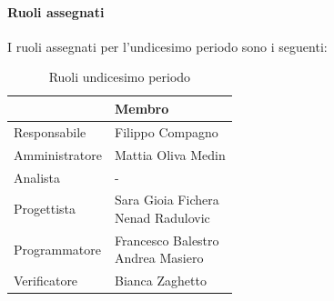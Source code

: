 \documentclass[a4paper,12pt]{article}
\begin{document}
            \paragraph{Ruoli assegnati}
            I ruoli assegnati per l'undicesimo periodo sono i seguenti:
                \begin{table}[H]
                \centering
                \caption{Ruoli undicesimo periodo}
                \begin{tabular}{|l|l|}
                \hline
                    \rowcolor{lightgray}{\textbf{Ruolo}} & {\textbf{Membro}} \\
                \hline
                    Responsabile & Filippo Compagno  \\
                \hline
                    Amministratore & Mattia Oliva Medin  \\
                \hline
                    Analista & - \\
                \hline
                    Progettista & \makecell[l]{ Sara Gioia Fichera  \\ Nenad Radulovic }  \\
                \hline
                    Programmatore & \makecell[l]{ Francesco Balestro  \\ Andrea Masiero } \\
                \hline
                    Verificatore & Bianca Zaghetto \\
                \hline
                \end{tabular}
                \end{table}
                
\end{document}
